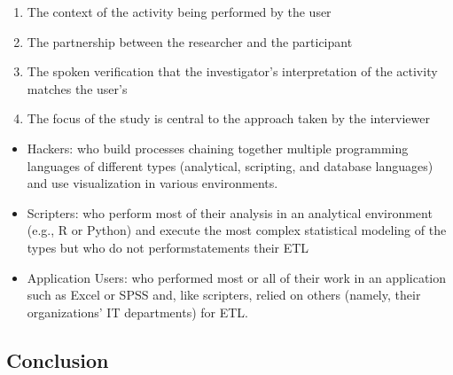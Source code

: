 \documentclass[
]{article}
\providecommand{\tightlist}{%
  \setlength{\itemsep}{0pt}\setlength{\parskip}{0pt}}
\begin{document}
\begin{enumerate}
\def\labelenumi{\arabic{enumi}.}
\tightlist
\item
  The context of the activity being performed by the user
\item
  The partnership between the researcher and the participant
\item
  The spoken verification that the investigator's interpretation of the
  activity matches the user's
\item
  The focus of the study is central to the approach taken by the
  interviewer
\end{enumerate}


\begin{itemize}
\tightlist
\item
  Hackers: who build processes chaining together multiple programming
  languages of different types (analytical, scripting, and database
  languages) and use visualization in various environments.
\item
  Scripters: who perform most of their analysis in an analytical
  environment (e.g., R or Python) and execute the most complex
  statistical modeling of the types but who do not performstatements
  their ETL
\item
  Application Users: who performed most or all of their work in an
  application such as Excel or SPSS and, like scripters, relied on
  others (namely, their organizations' IT departments) for ETL.
\end{itemize}

\hypertarget{conclusion}{%
\subsection{Conclusion}\label{conclusion}}
\end{document}
